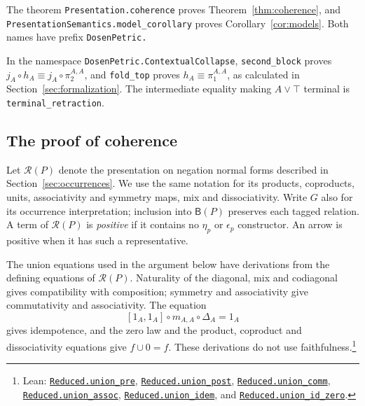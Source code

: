 \documentclass[11pt]{article}
\newcommand{\B}{\mathsf B}
\begin{document}
The theorem \texttt{Presentation.\allowbreak{}coherence} proves
Theorem~\ref{thm:coherence}, and
\texttt{PresentationSemantics.\allowbreak{}model\_corollary} proves
Corollary~\ref{cor:models}.
Both names have prefix \texttt{DosenPetric.}

In the namespace \texttt{DosenPetric.\allowbreak{}ContextualCollapse},
\texttt{second\_block} proves
$j_A\circ h_A\equiv j_A\circ\pi_2^{A,A}$, and
\texttt{fold\_top} proves
$h_A\equiv\pi_1^{A,A}$, as calculated in
Section~\ref{sec:formalization}.
The intermediate equality making $A\vee\top$ terminal is
\texttt{terminal\_retraction}.

\subsection{The proof of coherence}\label{app:coherence-proof}

Let $\mathcal R(P)$ denote the presentation on negation normal
forms described in Section~\ref{sec:occurrences}. We use the same
notation for its products, coproducts, units, associativity and
symmetry maps, mix and dissociativity. Write $G$ also for its occurrence
interpretation; inclusion into $\B(P)$ preserves each tagged
relation. A term of $\mathcal R(P)$
is \emph{positive} if it contains no $\eta_p$ or $\epsilon_p$
constructor. An arrow is positive when it has such a representative.

The union equations used in the argument below have derivations
from the defining equations of $\mathcal R(P)$.
Naturality of the diagonal, mix and codiagonal gives compatibility
with composition; symmetry and associativity give commutativity
and associativity. The equation
\[
 [1_A,1_A]\circ m_{A,A}\circ\Delta_A=1_A
\]
gives idempotence, and the zero law and the product, coproduct
and dissociativity equations give $f\cup0=f$.
These derivations do not use faithfulness.\footnote{\raggedright Lean:
\href{https://github.com/flengyel/Dosen-Petric-Maximality/blob/5dbee39bea09539bd130f729e82636419f71f920/DosenPetric/ReducedUnion.lean\#L80}{\texttt{Reduced.\allowbreak{}union\_pre}},
\href{https://github.com/flengyel/Dosen-Petric-Maximality/blob/5dbee39bea09539bd130f729e82636419f71f920/DosenPetric/ReducedUnion.lean\#L85}{\texttt{Reduced.\allowbreak{}union\_post}},
\href{https://github.com/flengyel/Dosen-Petric-Maximality/blob/5dbee39bea09539bd130f729e82636419f71f920/DosenPetric/ReducedUnion.lean\#L90}{\texttt{Reduced.\allowbreak{}union\_comm}},
\href{https://github.com/flengyel/Dosen-Petric-Maximality/blob/5dbee39bea09539bd130f729e82636419f71f920/DosenPetric/ReducedUnion.lean\#L131}{\texttt{Reduced.\allowbreak{}union\_assoc}},
\href{https://github.com/flengyel/Dosen-Petric-Maximality/blob/5dbee39bea09539bd130f729e82636419f71f920/DosenPetric/ReducedUnion.lean\#L97}{\texttt{Reduced.\allowbreak{}union\_idem}}, and
\href{https://github.com/flengyel/Dosen-Petric-Maximality/blob/5dbee39bea09539bd130f729e82636419f71f920/DosenPetric/ReducedUnion.lean\#L145}{\texttt{Reduced.\allowbreak{}union\_id\_zero}}.}
\end{document}
